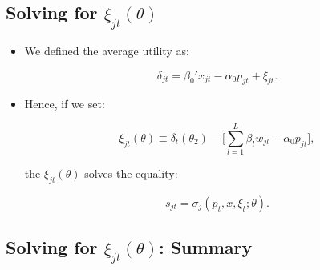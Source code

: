 \documentclass[]{book}
\providecommand{\tightlist}{%
  \setlength{\itemsep}{0pt}\setlength{\parskip}{0pt}}
\begin{document}
\subsection{\texorpdfstring{Solving for
\(\xi_{jt}(\theta)\)}{Solving for \textbackslash{}xi\_\{jt\}(\textbackslash{}theta)}}\label{solving-for-xi_jttheta}

\begin{itemize}
\tightlist
\item
  We defined the average utility as:

  \begin{equation}
  \delta_{jt} =  \beta_0' x_{jt} - \alpha_0 p_{jt} + \xi_{jt}.
  \end{equation}
\item
  Hence, if we set:

  \begin{equation}
  \xi_{jt}(\theta) \equiv \delta_t(\theta_2) - \Bigg[\sum_{l = 1}^L \beta_{l} w_{jl} - \alpha_0 p_{jt} \Bigg],
  \end{equation}

  the \(\xi_{jt}(\theta)\) solves the equality:

  \begin{equation}
  s_{jt} = \sigma_{j}(p_t, x, \xi_t; \theta).
  \end{equation}
\end{itemize}

\subsection{\texorpdfstring{Solving for \(\xi_{jt}(\theta)\):
Summary}{Solving for \textbackslash{}xi\_\{jt\}(\textbackslash{}theta): Summary}}\label{solving-for-xi_jttheta-summary}
\end{document}
